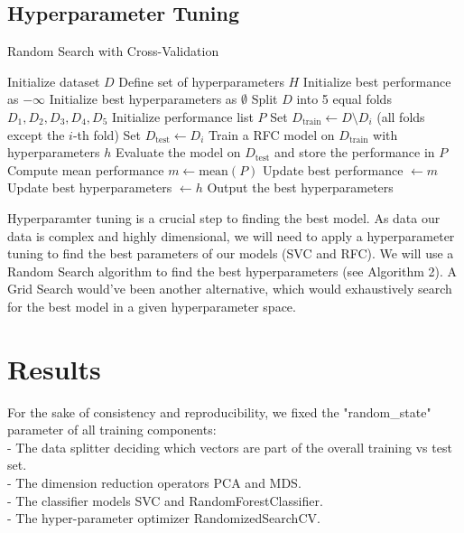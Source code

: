 \documentclass[twocolumn]{article}
\begin{document}
\subsection{Hyperparameter Tuning}
\label{4.5}
\begin{algorithm}
\caption{Random Search with Cross-Validation}
\label{algo5}
\begin{algorithmic}[1]
\State Initialize dataset $D$
\State Define set of hyperparameters $H$
\State Initialize best performance as $-\infty$
\State Initialize best hyperparameters as $\emptyset$
    \State Split $D$ into 5 equal folds $D_1, D_2, D_3, D_4, D_5$
    \State Initialize performance list $P$
        \State Set $D_{\text{train}} \gets D \setminus D_i$ (all folds except the $i$-th fold)
        \State Set $D_{\text{test}} \gets D_i$
        \State Train a RFC model on $D_{\text{train}}$ with hyperparameters $h$
        \State Evaluate the model on $D_{\text{test}}$ and store the performance in $P$
    \EndFor
    \State Compute mean performance $m \gets \text{mean}(P)$
        \State Update best performance $ \gets m$
        \State Update best hyperparameters $\gets h$
    \EndIf
\EndFor
\State Output the best hyperparameters
\end{algorithmic}
\end{algorithm}

Hyperparamter tuning is a crucial step to finding the best model. As data our data is complex and highly dimensional, we will need to apply a hyperparameter tuning to find the best parameters of our models (SVC and RFC). We will use a Random Search algorithm to find the best hyperparameters (see Algorithm 2). A Grid Search would've been another alternative, which would exhaustively search for the best model in a given hyperparameter space.

\newpage
\section{Results}
\label{5}
For the sake of consistency and reproducibility, we fixed the "random\_state" parameter of all training components: \\
- The data splitter deciding which vectors are part of the overall training vs test set. \\
- The dimension reduction operators PCA and MDS. \\
- The classifier models SVC and RandomForestClassifier. \\
- The hyper-parameter optimizer RandomizedSearchCV.
\end{document}
